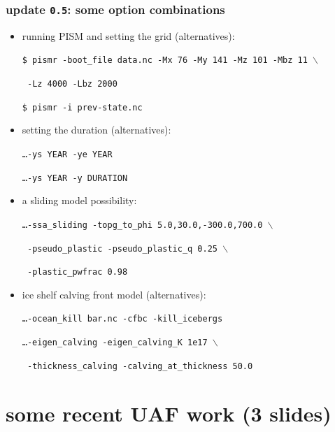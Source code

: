 \documentclass[hide notes,intlimits]{beamer}
\begin{document}
\begin{frame}
  \frametitle{update \texttt{0.5}: some option combinations}
  \begin{itemize}
  \item running PISM and setting the grid (alternatives):
    \small

    \texttt{\$ pismr -boot\_file data.nc -Mx 76 -My 141 -Mz 101 -Mbz 11 $\backslash$}
    
    \texttt{\phantom{foobar} -Lz 4000 -Lbz 2000}

    \texttt{\$ pismr -i prev-state.nc}
    \normalsize
  \item setting the duration (alternatives):
    \small

    \texttt{\dots\quad -ys YEAR -ye YEAR}
    
    \texttt{\dots\quad -ys YEAR -y DURATION}
    \normalsize
  \item a sliding model possibility:
    \small

    \texttt{\dots\quad -ssa\_sliding -topg\_to\_phi 5.0,30.0,-300.0,700.0 $\backslash$}
    
    \texttt{\phantom{foobar} -pseudo\_plastic -pseudo\_plastic\_q 0.25 $\backslash$}
    
    \texttt{\phantom{foobar} -plastic\_pwfrac 0.98 }
    \normalsize

  \item ice shelf calving front model (alternatives):
    \small

    \texttt{\dots\quad -ocean\_kill bar.nc -cfbc -kill\_icebergs}

    \texttt{\dots\quad -eigen\_calving -eigen\_calving\_K 1e17 $\backslash$}
    
    \texttt{\phantom{foobar} -thickness\_calving -calving\_at\_thickness 50.0}
    \normalsize
  \end{itemize}
\end{frame}


\section[UAF work]{some recent UAF work (3 slides)}
\end{document}
